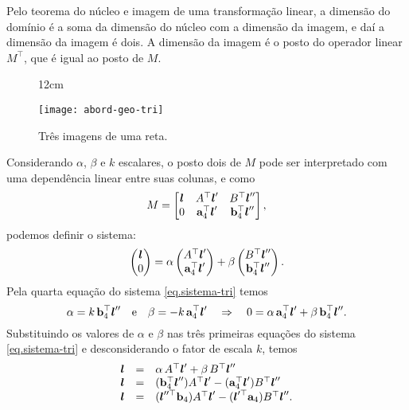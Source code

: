 Pelo teorema do núcleo e imagem de uma transformação linear, a dimensão do domínio é a soma da dimensão do núcleo com a dimensão da imagem, e daí a dimensão da imagem é dois. A dimensão da imagem é o posto do operador linear $M^\top$, que é igual ao posto de $M$.
\begin{figure}[!htb]{12cm}
\caption{Tr\^es imagens de uma reta.}
\texttt{[image: abord-geo-tri]}
\label{fig.abord-geo-tri}
\end{figure}
Considerando $\alpha$, $\beta$ e $k$ escalares, o posto dois de $M$ pode ser interpretado com uma dependência linear entre suas colunas, e como
\begin{equation*}
M=
\begin{bmatrix}
\boldsymbol{l}&A^\top\boldsymbol{l}'&B^\top\boldsymbol{l}''\\
0&{\bf a}^\top_4\boldsymbol{l}'&
{\bf b}^\top_4\boldsymbol{l}''
\end{bmatrix},
\end{equation*}
podemos definir o sistema:
\begin{equation}\label{eq.sistema-tri}
\begin{pmatrix}
\boldsymbol{l}\\
0
\end{pmatrix}
=
\alpha
\begin{pmatrix}
A^\top\boldsymbol{l}'\\
{\bf a}^\top_4\boldsymbol{l}'
\end{pmatrix}
+\beta
\begin{pmatrix}
B^\top\boldsymbol{l}''\\
{\bf b}^\top_4\boldsymbol{l}''
\end{pmatrix}.
\end{equation}
Pela quarta equação do sistema \ref{eq.sistema-tri} temos
\begin{equation*}
\alpha=k\,{\bf b}^\top_4\boldsymbol{l}''\quad\text{e}\quad\beta=-k\,{\bf a}^\top_4\boldsymbol{l}'\quad\Rightarrow\quad0=\alpha\,{\bf a}^\top_4\boldsymbol{l}'+\beta\,{\bf b}^\top_4\boldsymbol{l}''.
\end{equation*}
Substituindo os valores de $\alpha$ e $\beta$ nas três primeiras equações do sistema \ref{eq.sistema-tri} e desconsiderando o fator de escala $k$, temos
\begin{equation*}
\begin{array}{rcl}
\boldsymbol{l}&=&\alpha\,A^\top\boldsymbol{l}'+\beta\,B^\top\boldsymbol{l}''\\
\boldsymbol{l}&=&({\bf b}^\top_4\boldsymbol{l}'')A^\top\boldsymbol{l}'-({\bf a}^\top_4\boldsymbol{l}')B^\top\boldsymbol{l}''\\
\boldsymbol{l}&=&(\boldsymbol{l}''^\top{\bf b}_4)A^\top\boldsymbol{l}'-(\boldsymbol{l}'^\top{\bf a}_4)B^\top\boldsymbol{l}''.
\end{array}
\end{equation*}
